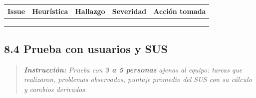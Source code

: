 {\def\LTcaptype{none} %
\begin{longtable}[]{@{}
  >{\raggedright\arraybackslash}p{}
  >{\raggedright\arraybackslash}p{}
  >{\raggedright\arraybackslash}p{}
  >{\raggedright\arraybackslash}p{}
  >{\raggedright\arraybackslash}p{}@{}}
\toprule\noalign{}
\begin{minipage}[b]{\linewidth}\raggedright
\textbf{Issue}
\end{minipage} & \begin{minipage}[b]{\linewidth}\raggedright
\textbf{Heurística}
\end{minipage} & \begin{minipage}[b]{\linewidth}\raggedright
\textbf{Hallazgo}
\end{minipage} & \begin{minipage}[b]{\linewidth}\raggedright
\textbf{Severidad}
\end{minipage} & \begin{minipage}[b]{\linewidth}\raggedright
\textbf{Acción tomada}
\end{minipage} \\
\midrule\noalign{}
\endhead
\bottomrule\noalign{}
\endlastfoot
& & & & \\
& & & & \\
& & & & \\
\end{longtable}
}

\subsection{8.4 Prueba con usuarios y
SUS}\label{prueba-con-usuarios-y-sus}

\begin{quote}
\emph{\textbf{Instrucción:}} \emph{Prueba con} \emph{\textbf{3 a 5
personas}} \emph{ajenas al equipo:} \emph{tareas que realizaron,
problemas observados, puntaje} \emph{promedio del SUS con su cálculo y
cambios derivados.}
\end{quote}

